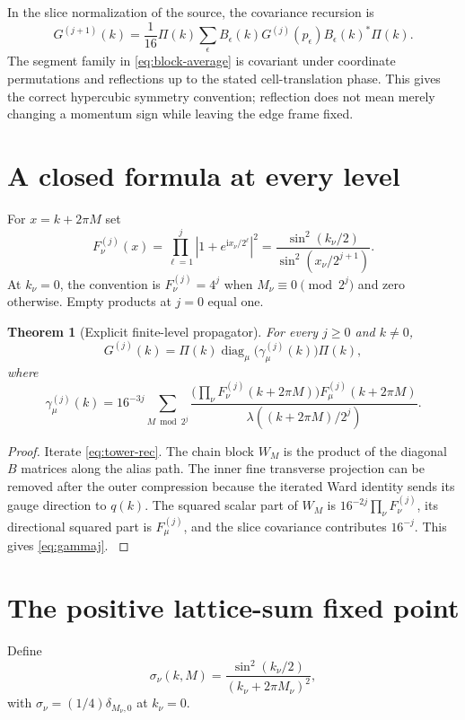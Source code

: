 \documentclass[11pt,oneside,openany]{book}
\newtheorem{theorem}{Theorem}[chapter]
\theoremstyle{definition}
\theoremstyle{remark}
\newcommand{\ii}{\mathrm i}
\newcommand{\diag}{\operatorname{diag}}
\newcommand{\src}[2]{\cite[#2]{#1}}
\begin{document}
In the slice normalization of the source, the covariance recursion is
\begin{equation}\label{eq:tower-rec}
G^{(j+1)}(k)=\frac1{16}\Pi(k)
\sum_{\epsilon}B_\epsilon(k)G^{(j)}(p_\epsilon)B_\epsilon(k)^*\Pi(k).
\end{equation}
The segment family in \cref{eq:block-average} is covariant under coordinate permutations and reflections up to the stated cell-translation phase. This gives the correct hypercubic symmetry convention; reflection does not mean merely changing a momentum sign while leaving the edge frame fixed.

\section{A closed formula at every level}
For $x=k+2\pi M$ set
\begin{equation}\label{eq:Fj}
F_\nu^{(j)}(x)=\prod_{\ell=1}^{j}|1+e^{\ii x_\nu/2^\ell}|^2
=\frac{\sin^2(k_\nu/2)}{\sin^2(x_\nu/2^{j+1})}.
\end{equation}
At $k_\nu=0$, the convention is $F_\nu^{(j)}=4^j$ when $M_\nu\equiv0\pmod{2^j}$ and zero otherwise. Empty products at $j=0$ equal one.

\begin{theorem}[Explicit finite-level propagator]\label{thm:tower-explicit}
For every $j\ge0$ and $k\ne0$,
\begin{equation}\label{eq:Gj}
G^{(j)}(k)=\Pi(k)\diag_\mu\bigl(\gamma_\mu^{(j)}(k)\bigr)\Pi(k),
\end{equation}
where
\begin{equation}\label{eq:gammaj}
\gamma_\mu^{(j)}(k)=16^{-3j}
\sum_{M\bmod2^j}
\frac{\bigl(\prod_\nu F_\nu^{(j)}(k+2\pi M)\bigr)
F_\mu^{(j)}(k+2\pi M)}
{\lambda((k+2\pi M)/2^j)}.
\end{equation}
\end{theorem}
\begin{proof}
Iterate \cref{eq:tower-rec}. The chain block $W_M$ is the product of the diagonal $B$ matrices along the alias path. The inner fine transverse projection can be removed after the outer compression because the iterated Ward identity sends its gauge direction to $q(k)$. The squared scalar part of $W_M$ is $16^{-2j}\prod_\nu F_\nu^{(j)}$, its directional squared part is $F_\mu^{(j)}$, and the slice covariance contributes $16^{-j}$. This gives \cref{eq:gammaj}. \src{F11}{V37}
\end{proof}

\section{The positive lattice-sum fixed point}
Define
\[
\sigma_\nu(k,M)=\frac{\sin^2(k_\nu/2)}{(k_\nu+2\pi M_\nu)^2},
\]
with $\sigma_\nu=(1/4)\delta_{M_\nu,0}$ at $k_\nu=0$.
\end{document}

